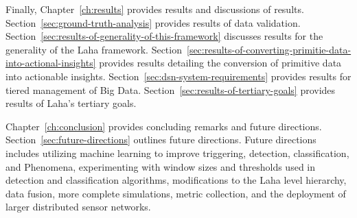 Finally, Chapter~\ref{ch:results} provides results and discussions of results. Section~\ref{sec:ground-truth-analysis} provides results of data validation. Section~\ref{sec:results-of-generality-of-this-framework} discusses results for the generality of the Laha framework. Section~\ref{sec:results-of-converting-primitie-data-into-actional-insights} provides results detailing the conversion of primitive data into actionable insights. Section~\ref{sec:dsn-system-requirements} provides results for tiered management of Big Data. Section~\ref{sec:results-of-tertiary-goals} provides results of Laha's tertiary goals.

Chapter~\ref{ch:conclusion} provides concluding remarks and future directions. Section~\ref{sec:future-directions} outlines future directions. Future directions includes utilizing machine learning to improve triggering, detection, classification, and Phenomena, experimenting with window sizes and thresholds used in detection and classification algorithms, modifications to the Laha level hierarchy, data fusion, more complete simulations, metric collection, and the deployment of larger distributed sensor networks.









